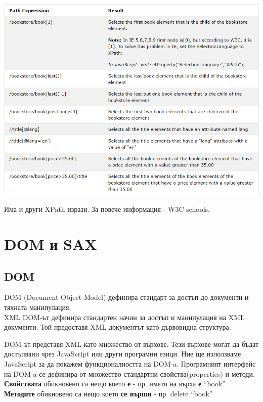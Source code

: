 \documentclass[11pt]{article} %
\begin{document}
\begin{center}
\includegraphics[scale=0.75]{Predicates.png}
\end{center}

Има и други XPath изрази. За повече информация - W3C schools.

\section{DOM и SAX}
\subsection{DOM}
DOM (Document Object Model) дефинира стандарт за достъп до документи и тяхната манипулация. \\
XML DOM-ът дефинира стандартен начин за достъп и манипулация на XML документи. Той предоставя XML документът като дървовидна структура. \\\par
DOM-ът представя XML като множество от върхове. Тези върхове могат да бъдат достъпвани чрез JavaScript или други програмни езици. Ние ще използваме JavaScript за да покажем функционалността на DOM-a. Програмният интерфейс на DOM-a се дефинира от множество стандартни свойства(properties) и методи. \\
\textbf{Свойствата} обикновено са нещо което \textbf{е} - пр.  името на върха \textbf{е} \enquote{book}\\
\textbf{Методите} обикновено са нещо което \textbf{се върши} - пр. delete \enquote{book}\\\par
\end{document}
